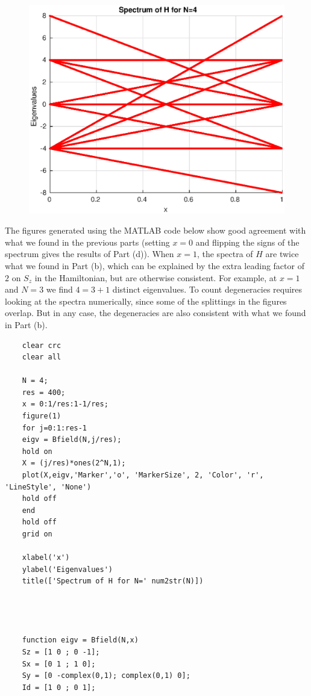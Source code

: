 \documentclass{article}
\theoremstyle{definition}
\begin{document}
\begin{enumerate}[label=(\alph*)]
\begin{figure}[!htb]
\begin{minipage}{0.49\textwidth}
			\includegraphics[width=\textwidth]{2g_N4.eps}
		\end{minipage}
	\end{figure}

	The figures generated using the MATLAB code below show good agreement with what we found in the previous parts (setting $x=0$ and flipping the signs of the spectrum gives the results of Part (d)). When $x=1$, the spectra of $H$ are twice what we found in Part (b), which can be explained by the extra leading factor of $2$ on $S_z$ in the Hamiltonian, but are otherwise consistent. For example, at $x=1$ and $N=3$ we find $4=3+1$ distinct eigenvalues. To count degeneracies requires looking at the spectra numerically, since some of the splittings in the figures overlap. But in any case, the degeneracies are also consistent with what we found in Part (b). 
	\begin{lstlisting}
	clear crc
	clear all
	
	N = 4;
	res = 400;
	x = 0:1/res:1-1/res;
	figure(1)
	for j=0:1:res-1
	eigv = Bfield(N,j/res); 
	hold on
	X = (j/res)*ones(2^N,1);
	plot(X,eigv,'Marker','o', 'MarkerSize', 2, 'Color', 'r', 'LineStyle', 'None')
	hold off
	end
	hold off
	grid on
	
	xlabel('x')
	ylabel('Eigenvalues')
	title(['Spectrum of H for N=' num2str(N)])
	
	
	
	
	function eigv = Bfield(N,x)
	Sz = [1 0 ; 0 -1];
	Sx = [0 1 ; 1 0];
	Sy = [0 -complex(0,1); complex(0,1) 0];
	Id = [1 0 ; 0 1];
	

\end{lstlisting}
\end{enumerate}
\end{document}
